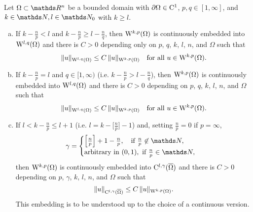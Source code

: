 \begin{thm}
  Let $\Omega \subset \R^n$ be a bounded domain with $\partial\Omega \in \mathrm{C}^1$, $p,q \in [1,\infty]$, and $k \in \N, l \in \N_0$ with $k \geq l$.
  \begin{enumerate}[a)]
    \item If $k - \frac{n}{p} < l$ and $k - \frac{n}{p} \geq l - \frac{n}{q}$, then $\mathrm{W}^{k,p}(\Omega)$ is continuously embedded into $\mathrm{W}^{l,q}(\Omega)$ and there is $C > 0$ depending only on $p$, $q$, $k$, $l$, $n$, and $\Omega$ such that
      $$
      \|u\|_{\mathrm{W}^{l,q}(\Omega)} \leq C \, \|u\|_{\mathrm{W}^{k,p}(\Omega)} \quad\text{for all } u \in \mathrm{W}^{k,p}(\Omega).
      $$

    \item If $k - \frac{n}{p} = l$ and $q \in [1,\infty)$ (i.e. $k - \frac{n}{p} > l - \frac{n}{q}$), then $\mathrm{W}^{k,p}(\Omega)$ is continuously embedded into $\mathrm{W}^{l,q}(\Omega)$ and there is $C > 0$ depending on $p$, $q$, $k$, $l$, $n$, and $\Omega$ such that
      $$
      \|u\|_{\mathrm{W}^{l,q}(\Omega)} \leq C \, \|u\|_{\mathrm{W}^{k,p}(\Omega)} \quad\text{for all } u \in \mathrm{W}^{k,p}(\Omega).
      $$

    \item If $l < k - \frac{n}{p} \leq l + 1$ (i.e. $l = k - \Big[\frac{n}{p}\Big] - 1$) and, setting $\frac{n}{p} = 0$ if $p = \infty$,
      $$
      \gamma = \begin{cases} \Big[ \frac{n}{p} \Big] + 1 - \frac{n}{p}, \quad\text{if } \frac{n}{p} \not \in \N, \\ \text{arbitrary in }(0,1), \text{ if } \frac{n}{p} \in \N, \end{cases}
      $$
      then $\mathrm{W}^{k,p}(\Omega)$ is continuously embedded into $\mathrm{C}^{l,\gamma}(\overline\Omega)$ and there is $C > 0$ depending on $p$, $\gamma$, $k$, $l$, $n$, and $\Omega$ such that
      $$
      \| u\|_{\mathrm{C}^{l,\gamma}(\overline\Omega)} \leq C \, \|u\|_{\mathrm{W}^{k,p}(\Omega)}.
      $$
      This embedding is to be understood up to the choice of a continuous version.
  \end{enumerate}
\end{thm}

